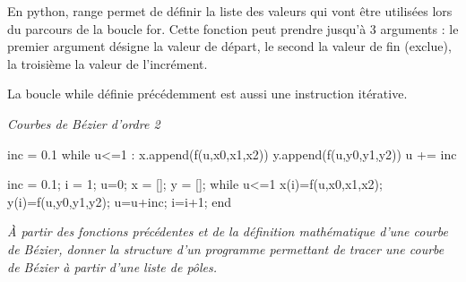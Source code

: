 \documentclass[10pt]{article}
\begin{document}
\begin{rem}
En python, \textsf{range} permet de définir la liste des valeurs qui vont être utilisées lors du parcours de la boucle \textsf{for}.  Cette fonction peut prendre jusqu'à 3 arguments : le premier argument désigne la valeur de départ, le second la valeur de fin (exclue), la troisième la valeur de l'incrément. 
\end{rem}

\begin{rem}
La boucle \textsf{while} définie précédemment est aussi une instruction itérative. 
\end{rem}


\begin{exemple}
\textit{Courbes de Bézier d'ordre 2}


\begin{minipage}[c]{.49\linewidth}
\begin{py}
\begin{python}
inc = 0.1
while u<=1 :
    x.append(f(u,x0,x1,x2))
    y.append(f(u,y0,y1,y2))
    u += inc
\end{python}
\end{py}
\end{minipage}\hfill
\begin{minipage}[c]{.49\linewidth}
\begin{sci}
\begin{scilab}
inc = 0.1; i = 1;
u=0;
x = []; y = [];
while u<=1
    x(i)=f(u,x0,x1,x2);
    y(i)=f(u,y0,y1,y2);
    u=u+inc;
    i=i+1;
end
\end{scilab}
\end{sci}
\end{minipage}

\end{exemple}



\begin{exemple}
\textit{\`A partir des fonctions précédentes et de la définition mathématique d'une courbe de Bézier, donner la structure d'un programme permettant de tracer une courbe de Bézier à partir d'une liste de pôles.}

\end{exemple}
\begin{thebibliography}{2}
\end{thebibliography}
\end{document}
